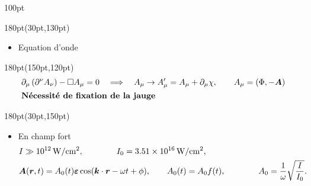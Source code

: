 \begin{frame}
\begin{textblock*}{100pt}
\end{textblock*}

\begin{textblock*}{180pt}(30pt,130pt)
\footnotesize
\begin{itemize}
\item Equation d'onde

\end{itemize}

\end{textblock*}



\begin{textblock*}{180pt}(150pt,120pt)
\footnotesize
\begin{align*}
& \partial_\mu \left( \partial^\nu A_\nu \right)
    - \Box A_\mu = 0  \quad \Longrightarrow \quad
 A_\mu \rightarrow A^\prime_\mu = A_\mu + \partial_\mu \chi,\qquad 
A_\mu = \left(\Phi,-\boldsymbol{A}\right) \\
& \mbox{\textbf{N\'ecessit\'e de fixation de la jauge}}
\end{align*}

\end{textblock*}

\begin{textblock*}{180pt}(30pt,150pt)
\footnotesize
\begin{itemize}
\item En champ fort 
\begin{align*}
 & I \gg 10^{12}\,{\rm W/cm^2}, \qquad\qquad I_0 = 3.51\times 10^{16}\,\rm W/cm^2,\\
 & \boldsymbol{A}(\boldsymbol{r},t) = A_0(t)\boldsymbol{\varepsilon}
 \cos (\boldsymbol{k}\cdot\boldsymbol{r}-\omega t + \phi),
   \qquad A_0(t)=A_0f(t), \qquad\qquad A_0 = \frac{1}{\omega}\sqrt{\frac{I}{I_0}}.
\end{align*}


\end{itemize}
\end{textblock*}
\end{frame}
